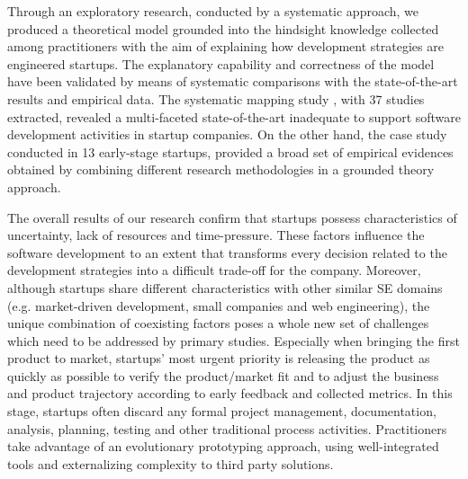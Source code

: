 \documentclass[10pt,journal,letterpaper,compsoc]{IEEEtran}
\begin{document}
Through an exploratory research, conducted by a systematic approach, we
produced a theoretical model grounded into the hindsight knowledge collected
among practitioners with the aim of explaining how development strategies are
engineered startups. The explanatory capability and correctness of the model
have been validated by means of systematic comparisons with the state-of-the-art
results and empirical data. The systematic mapping study \cite{SMS},  with 37
studies extracted, revealed a  multi-faceted state-of-the-art inadequate to
support software development  activities in startup companies. 
On the other hand, the case study conducted in 13 early-stage startups,  
provided a broad set of empirical evidences obtained by combining different  
research methodologies in a grounded theory approach.

The overall results of our research confirm that startups possess 
characteristics of uncertainty, lack of resources and time-pressure. These  
factors influence the software development to an extent that
transforms every  decision related to the development strategies into a
difficult trade-off for  the company. Moreover, although startups share
different characteristics with  other similar SE domains (e.g. market-driven
development, small companies and  web engineering), the unique combination of
coexisting factors poses a whole new  set of challenges which need to be
addressed by primary studies. Especially when  bringing the first product to
market, startups' most urgent priority is  releasing the product as quickly as
possible to verify the product/market fit  and to adjust the business and
product trajectory according to early feedback  and collected metrics. In this
stage, startups often discard any formal project  management, documentation,
analysis, planning, testing and other traditional  process activities.
Practitioners take advantage of an evolutionary prototyping  approach, using
well-integrated tools and externalizing complexity to third  party solutions.
\end{document}
